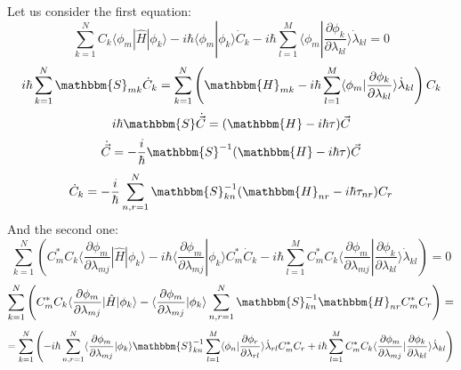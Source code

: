 \documentclass[a4paper,14pt]{extarticle}
\begin{document}
Let us consider the first equation:
$$\sum_{k=1}^N C_k\langle\phi_m|\hat{H}|\phi_k\rangle - %
	       i\hbar\langle\phi_m|\phi_k\rangle \dot{C}_k - %
	       i\hbar\sum_{l=1}^M\langle\phi_m|\frac{\partial\phi_k}{\partial\lambda_{kl}}\rangle\dot{\lambda}_{kl}=0$$
$$i\hbar\sum_{k=1}^N\mathbbm{S}_{mk}\dot{C}_k=\sum_{k=1}^N\left(\mathbbm{H}_{mk}-%
							  i\hbar\sum_{l=1}^M\langle\phi_m|\frac{\partial\phi_k}{\partial\lambda_{kl}}\rangle\dot{\lambda}_{kl}\right)C_k$$
$$i\hbar\mathbbm{S}\dot{\vec{C}}=(\mathbbm{H}-i\hbar\tau)\vec{C}$$
$$\dot{\vec{C}} = -\frac{i}{\hbar}\mathbbm{S}^{-1}(\mathbbm{H}-i\hbar\tau)\vec{C}$$
$$\dot{C}_k = -\frac{i}{\hbar}\sum_{n,r=1}^N \mathbbm{S}^{-1}_{kn}(\mathbbm{H}_{nr}-i\hbar\tau_{nr})C_r$$
And the second one:
$$\sum_{k=1}^N\left(C_m^*C_k\langle\frac{\partial\phi_m}{\partial\lambda_{mj}}|\hat{H}|\phi_k\rangle-%
	     i\hbar\langle\frac{\partial\phi_m}{\partial\lambda_{mj}}|\phi_k\rangle C_m^*\dot{C}_k-%
	     i\hbar\sum_{l=1}^MC_m^*C_k\langle\frac{\partial\phi_m}{\partial\lambda_{mj}}|\frac{\partial\phi_k}{\partial\lambda_{kl}}\rangle\dot{\lambda}_{kl}\right)=0$$
$$\sum_{k=1}^N\left(C_m^*C_k\langle\frac{\partial\phi_m}{\partial\lambda_{mj}}|\hat{H}|\phi_k\rangle-%
		    \langle\frac{\partial\phi_m}{\partial\lambda_{mj}}|\phi_k\rangle\sum_{n,r=1}^N\mathbbm{S}^{-1}_{kn}\mathbbm{H}_{nr}C_m^*C_r\right)=$$
$$= \sum_{k=1}^N\left(-i\hbar\sum_{n,r=1}^N\langle\frac{\partial\phi_m}{\partial\lambda_{mj}}|\phi_k\rangle\mathbbm{S}_{kn}^{-1}%
		             \sum_{l=1}^M\langle\phi_n|\frac{\partial\phi_r}{\partial\lambda_{rl}}\rangle\dot{\lambda}_{rl}C_m^*C_r+%
     		       i\hbar\sum_{l=1}^MC_m^*C_k\langle\frac{\partial\phi_m}{\partial\lambda_{mj}}|\frac{\partial\phi_k}{\partial\lambda_{kl}}\rangle\dot{\lambda}_{kl}\right)$$
\end{document}

